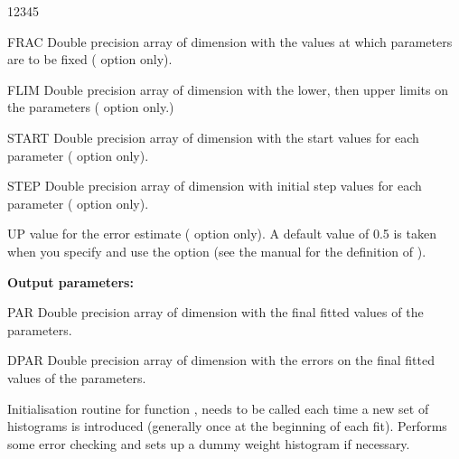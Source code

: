 \begin{DLtt}{12345}
\item[FRAC] Double precision array of dimension  with the values at which
            parameters are to be fixed ( option only).
\item[FLIM] Double precision array of dimension  with the lower, then
            upper limits on the parameters ( option only.)
\item[START] Double precision array of dimension  with the start values for
            each parameter ( option only).
\item[STEP] Double precision array of dimension  with initial step values for each
            parameter ( option only).
\item[UP]    value for the error estimate ( option only).  
            A default value of 0.5 is taken when you specify 
            and use the  option
            (see the \MINUIT{} manual for the definition of ).
\item[{\rm\bf Output parameters:}]
\item[PAR]  Double precision array of dimension  with the final fitted values
            of the parameters.
\item[DPAR] Double precision array of dimension  with the errors
            on the final fitted values of the parameters.
\end{DLtt}
 
 
\newpage%
 
 
\Action
Initialisation routine for function , needs to be called
each time a new set of histograms is introduced (generally once at the
beginning of each fit). 
Performs some error checking and sets up a dummy 
weight histogram if necessary.
 
